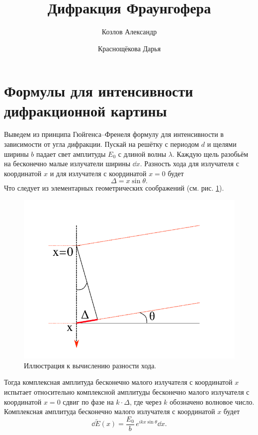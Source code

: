 \documentclass[12pt]{article}
\title{Дифракция Фраунгофера}
\author{Козлов Александр \and Краснощёкова Дарья}
\begin{document}
	\maketitle
	\section{Формулы для интенсивности дифракционной картины}
	Выведем из принципа Гюйгенса\---Френеля формулу для интенсивности в зависимости от угла дифракции. Пускай на решётку с периодом $d$ и щелями ширины $b$ падает свет амплитуды $E_0$ с длиной волны $\lambda$. Каждую щель разобьём на бесконечно малые излучатели ширины $\dd x$. Разность хода для излучателя с координатой $x$ и для излучателя с координатой $x=0$ будет
	\begin{equation}
		\Delta = x \sin{\theta}.
	\end{equation}
	Что следует из элементарных геометрических соображений (см. рис. \ref{fig:figure1}).
	\begin{figure}[ht]
		\centering
		\includegraphics[width=\linewidth]{../images/fig1}
		\caption{Иллюстрация к вычислению разности хода.}
		\label{fig:figure1}
	\end{figure}
	Тогда комплексная амплитуда бесконечно малого излучателя с координатой $x$ испытает относительно комплексной амплитуды бесконечно малого излучателя с координатой $x=0$ сдвиг по фазе на $k\cdot\Delta$, где через $k$ обозначено волновое число. Комплексная амплитуда бесконечно малого излучателя с координатой $x$ будет
	\begin{equation}
	 	\dd \tilde{E}(x) = \dfrac{E_0}{b}\, e^{i k x \sin{\theta}}\dd x.
	\end{equation}
\end{document}
